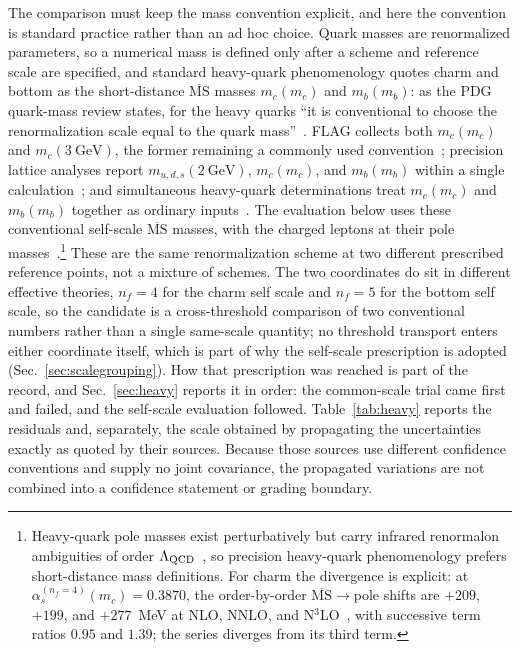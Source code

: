 \documentclass[aps,twocolumn,superscriptaddress,nofootinbib,floatfix]{revtex4-2}
\newcommand{\MSbar}{\overline{\mathrm{MS}}}
\begin{document}
The comparison must keep the mass convention explicit, and here the convention is standard practice rather than an ad hoc choice. Quark masses are renormalized parameters, so a numerical mass is defined only after a scheme and reference scale are specified, and standard heavy-quark phenomenology quotes charm and bottom as the short-distance $\MSbar$ masses $m_c(m_c)$ and $m_b(m_b)$: as the PDG quark-mass review states, for the heavy quarks ``it is conventional to choose the renormalization scale equal to the quark mass''~\cite{PDG2026}. FLAG collects both $m_c(m_c)$ and $m_c(3~\mathrm{GeV})$, the former remaining a commonly used convention~\cite{FLAG2024}; precision lattice analyses report $m_{u,d,s}(2~\mathrm{GeV})$, $m_c(m_c)$, and $m_b(m_b)$ within a single calculation~\cite{Bazavov2018Masses}; and simultaneous heavy-quark determinations treat $m_c(m_c)$ and $m_b(m_b)$ together as ordinary inputs~\cite{ErlerLuo2003,KomijaniPetreczkyWeber2020}. The evaluation below uses these conventional self-scale $\MSbar$ masses, with the charged leptons at their pole masses~\cite{PDG2026}.\footnote{Heavy-quark pole masses exist perturbatively but carry infrared renormalon ambiguities of order $\Lambda_{\rm QCD}$~\cite{Bigi1994Pole,PDG2026}, so precision heavy-quark phenomenology prefers short-distance mass definitions. For charm the divergence is explicit: at $\alpha_s^{(n_f=4)}(m_c)=0.3870$, the order-by-order $\MSbar\to$pole shifts are $+209$, $+199$, and $+277$~MeV at NLO, NNLO, and N$^3$LO~\cite{MvR2000,Marquard2015}, with successive term ratios $0.95$ and $1.39$; the series diverges from its third term.} These are the same renormalization scheme at two different prescribed reference points, not a mixture of schemes. The two coordinates do sit in different effective theories, $n_f=4$ for the charm self scale and $n_f=5$ for the bottom self scale, so the candidate is a cross-threshold comparison of two conventional numbers rather than a single same-scale quantity; no threshold transport enters either coordinate itself, which is part of why the self-scale prescription is adopted (Sec.~\ref{sec:scalegrouping}). How that prescription was reached is part of the record, and Sec.~\ref{sec:heavy} reports it in order: the common-scale trial came first and failed, and the self-scale evaluation followed. Table~\ref{tab:heavy} reports the residuals and, separately, the scale obtained by propagating the uncertainties exactly as quoted by their sources. Because those sources use different confidence conventions and supply no joint covariance, the propagated variations are not combined into a confidence statement or grading boundary.
\end{document}
